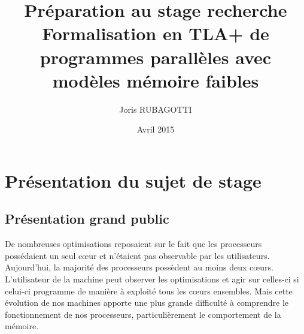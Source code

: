\documentclass[12pt,a4paper]{article}
\title{Préparation au stage recherche \\ Formalisation en TLA+ de programmes parallèles avec\\ modèles mémoire faibles}
\author{Joris RUBAGOTTI}
\date{Avril 2015}
\begin{document}
\maketitle

\section{Présentation du sujet de stage}

\subsection{Présentation grand public}

De nombreuses optimisations reposaient sur le fait que les processeurs possédaient un seul cœur et n'étaient pas observable par les utilisateurs. Aujourd'hui, la majorité des processeurs possèdent au moins deux cœurs. L'utilisateur de la machine peut observer les optimisations et agir sur celles-ci si celui-ci programme de manière à exploité tous les cœurs ensembles. Mais cette évolution de nos machines apporte une plus grande difficulté à comprendre le fonctionnement de nos processeurs, particulièrement le comportement de la mémoire.
\end{document}
